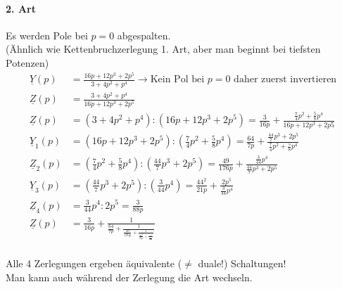 \paragraph{2. Art}
Es werden Pole bei $p=0$ abgespalten.\\
(Ähnlich wie Kettenbruchzerlegung 1. Art,
aber man beginnt bei tiefsten Potenzen)
\begin{align}
	\underline{Y}(p)&=\frac{16p+12p^3+2p^5}{3+4p^2+p^4}\rightarrow\text{Kein
	Pol bei }p=0\text{ daher zuerst invertieren}\nonumber\\
	\underline{Z}(p)&=\frac{3+4p^2+p^4}{16p+12p^3+2p^5}\nonumber\\
	\underline{Z}(p)&=\left(3+4p^2+p^4\right):\left(16p+12p^3+2p^5\right)=\frac{3}{16p}+\frac{\frac{7}{4}p^2+\frac{5}{8}p^4}{16p+12p^3+2p5}\nonumber\\
	\underline{Y}_1(p)&=\left(16p+12p^3+2p^5\right):\left(\frac{7}{4}p^2+\frac{5}{8}p^4\right)=\frac{64}{7p}+\frac{\frac{44}{7}p^3+2p^5}{\frac{7}{4}p^2+\frac{5}{8}p^4}\nonumber\\
	\underline{Z}_2(p)&=\left(\frac{7}{4}p^2+\frac{5}{8}p^4\right):\left(\frac{44}{7}p^3+2p^5\right)=\frac{49}{176p}+\frac{\frac{3}{44}p^4}{\frac{44}{7}p^3+2p^5}\nonumber\\
	\underline{Y}_3(p)&=\left(\frac{44}{7}p^3+2p^5\right):\left(\frac{3}{44}p^4\right)=\frac{44^2}{21p}+\frac{2p^5}{\frac{3}{44}p^4}\nonumber\\
	\underline{Z}_4(p)&=\frac{3}{44}p^4:2p^5=\frac{3}{88p}\nonumber\\
	\underline{Z}(p)&=\frac{3}{16p}+\frac{1}{\frac{64}{7p}+\frac{1}{\frac{49}{176p}+\frac{1}{\frac{44^2}{21p}+\frac{1}{\frac{3}{88p}}}}}\nonumber
\end{align}
\\
Alle 4 Zerlegungen ergeben äquivalente ($\neq$ duale!) Schaltungen!\\
Man kann auch während der Zerlegung die Art wechseln.\\